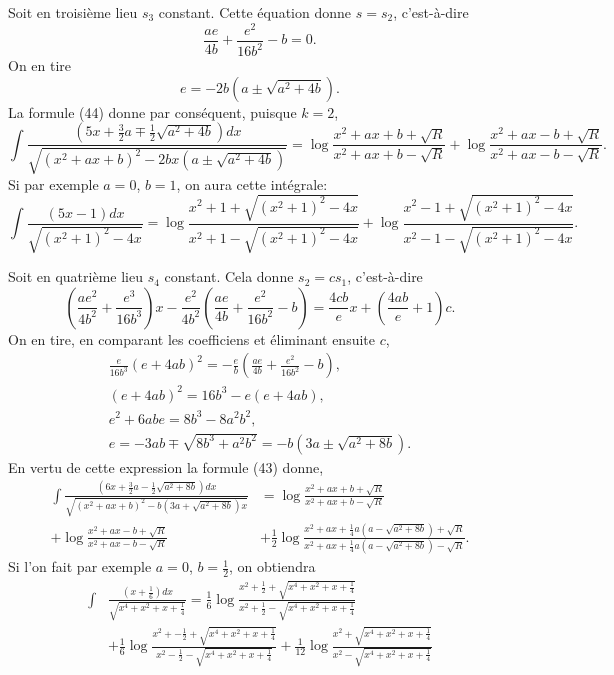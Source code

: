 \documentclass[oneside, 12 pt, leqno]{memoir}
\begin{document}
Soit en troisième lieu \(s_3\) constant. Cette équation donne \(s=s_2\), c'est-à-dire
\[\frac{a e}{4 b}+\frac{e^2}{16 b^2}-b=0.\]
On en tire
\[e=-2 b\left(a \pm \sqrt{a^2+4 b}\right).\]
La formule (44) donne par conséquent, puisque \(k=2\),
\[\int \frac{\left(5 x+\frac{3}{2} a \mp \frac{1}{2} \sqrt{a^2+4 b}\right) d x}{\sqrt{\left(x^2+a x+b\right)^2-2 b x\left(a \pm \sqrt{a^2+4 b}\right)}}
=\log \frac{x^2+a x+b+\sqrt{R}}{x^2+a x+b-\sqrt{R}}+\log \frac{x^2+a x-b+\sqrt{R}}{x^2+a x-b-\sqrt{R}}.\]
Si par exemple \(a=0\), \(b=1\), on aura cette intégrale:
\[\int \frac{(5 x-1) d x}{\sqrt{\left(x^2+1\right)^2-4 x}}=\log \frac{x^2+1+\sqrt{\left(x^2+1\right)^2-4 x}}{x^2+1-\sqrt{\left(x^2+1\right)^2-4 x}}+\log \frac{x^2-1+\sqrt{\left(x^2+1\right)^2-4 x}}{x^2-1-\sqrt{\left(x^2+1\right)^2-4 x}}.\]

Soit en quatrième lieu \(s_4\) constant. Cela donne \(s_2=c s_1\), c'est-à-dire
\[\left(\frac{a e^2}{4 b^2}+\frac{e^3}{16 b^3}\right) x-\frac{e^2}{4 b^2}\left(\frac{a e}{4 b}+\frac{e^2}{16 b^2}-b\right)=\frac{4 c b}{e} x+\left(\frac{4 a b}{e}+1\right) c.\]
On en tire, en comparant les coefficiens et éliminant ensuite \(c\),
\[\begin{gathered}
\frac{e}{16 b^3}(e+4 a b)^2=-\frac{e}{b}\left(\frac{a e}{4 b}+\frac{e^2}{16 b^2}-b\right),\\
(e+4 a b)^2=16 b^3-e(e+4 a b), \\
e^2+6 a b e=8 b^3-8 a^2 b^2, \\
e=-3 a b \mp \sqrt{8 b^3+a^2 b^2}=-b\left(3 a \pm \sqrt{a^2+8 b}\right).
\end{gathered}\]
En vertu de cette expression la formule (43) donne,
\[\begin{aligned}
\int \frac{\left(6 x+\frac{3}{2} a-\frac{1}{2} \sqrt{a^2+8 b}\right) d x}{\sqrt{\left(x^2+a x+b\right)^2-b\left(3 a+\sqrt{a^2+8 b}\right) x}}&=\log \frac{x^2+a x+b+\sqrt{R}}{x^2+a x+b-\sqrt{R}} \\
+\log \frac{x^2+a x-b+\sqrt{R}}{x^2+a x-b-\sqrt{R}}&+\frac{1}{2} \log \frac{x^2+a x+\frac{1}{4} a\left(a-\sqrt{a^2+8 b}\right)+\sqrt{R}}{x^2+a x+\frac{1}{4} a\left(a-\sqrt{a^2+8 b}\right)-\sqrt{R}}.
\end{aligned}\]
Si l'on fait par exemple \(a=0\), \(b=\frac{1}{2}\), on obtiendra
\[ \begin{aligned} \int &\frac{\left(x+\frac{1}{6}\right)dx}{\sqrt{x^4+x^2+x+\frac{1}{4}}} = \frac{1}{6} \log \frac{x^2 + \frac{1}{2} + \sqrt{x^4+x^2+x+\frac{1}{4}}}{x^2 + \frac{1}{2} - \sqrt{x^4+x^2+x+\frac{1}{4}}} \\
&+  \frac{1}{6} \log \frac{x^2 + -\frac{1}{2} + \sqrt{x^4+x^2+x+\frac{1}{4}}}{x^2 - \frac{1}{2} - \sqrt{x^4+x^2+x+\frac{1}{4}}} + \frac{1}{12} \log \frac{x^2 + \sqrt{x^4+x^2+x+\frac{1}{4}}}{x^2 - \sqrt{x^4+x^2+x+\frac{1}{4}}} 
\end{aligned}\]
\end{document}
